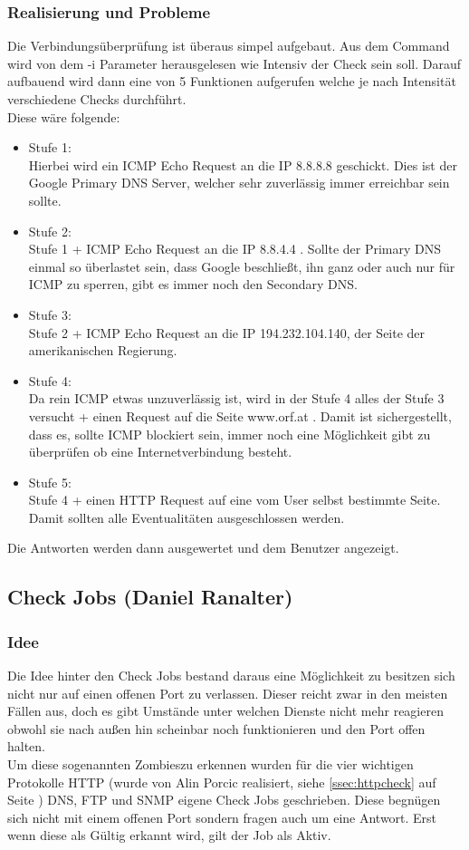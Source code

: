 \documentclass[12pt,a4paper]{report}
\begin{document}
\begin{onehalfspace}
\subsubsection{Realisierung und Probleme}
Die Verbindungsüberprüfung ist überaus simpel aufgebaut. Aus dem Command wird von dem -i Parameter herausgelesen wie Intensiv der Check sein soll. Darauf aufbauend wird dann eine von 5 Funktionen aufgerufen welche je nach Intensität verschiedene Checks durchführt.\\
Diese wäre folgende:
\begin{itemize}
\item Stufe 1:\\
Hierbei wird ein ICMP Echo Request an die IP 8.8.8.8 geschickt. Dies ist der Google Primary DNS Server, welcher sehr zuverlässig immer erreichbar sein sollte.
\item Stufe 2:\\
Stufe 1 + ICMP Echo Request an die IP 8.8.4.4 . Sollte der Primary DNS einmal so überlastet sein, dass Google beschließt, ihn ganz oder auch nur für ICMP zu sperren, gibt es immer noch den Secondary DNS.
\item Stufe 3:\\
Stufe 2 + ICMP Echo Request an die IP 194.232.104.140, der Seite der amerikanischen Regierung. 
\item Stufe 4:\\
Da rein ICMP etwas unzuverlässig ist, wird in der Stufe 4 alles der Stufe 3 versucht + einen Request auf die Seite www.orf.at . Damit ist sichergestellt, dass es, sollte ICMP blockiert sein, immer noch eine Möglichkeit gibt zu überprüfen ob eine Internetverbindung besteht.
\item Stufe 5:\\
Stufe 4 + einen HTTP Request auf eine vom User selbst bestimmte Seite. Damit sollten alle Eventualitäten ausgeschlossen werden. 
\end{itemize}
Die Antworten werden dann ausgewertet und dem Benutzer angezeigt.

\subsection{Check Jobs (Daniel Ranalter)}
\subsubsection{Idee}
Die Idee hinter den Check Jobs bestand daraus eine Möglichkeit zu besitzen sich nicht nur auf einen offenen Port zu verlassen. Dieser reicht zwar in den meisten Fällen aus, doch es gibt Umstände unter welchen Dienste nicht mehr reagieren obwohl sie nach außen hin scheinbar noch funktionieren und den Port offen halten.\\
Um diese sogenannten \glqq Zombies\grqq zu erkennen wurden für die vier wichtigen Protokolle HTTP (wurde von Alin Porcic realisiert, siehe \ref{ssec:httpcheck} auf Seite \pageref{ssec:httpcheck}) DNS, FTP und SNMP eigene Check Jobs geschrieben. Diese begnügen sich nicht mit einem offenen Port sondern fragen auch um eine Antwort. Erst wenn diese als Gültig erkannt wird, gilt der Job als Aktiv.


\end{onehalfspace}
\end{document}
